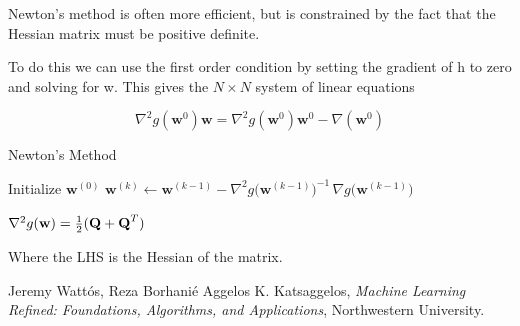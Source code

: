 \documentclass[11pt]{article}
\begin{document}
Newton's method is often more efficient, but is constrained by the fact that the Hessian matrix must be positive definite.

To do this we can use the first order condition by setting the gradient of h to zero and solving for w. This gives the $N \times N$ system
of linear equations

$$\nabla^2g(\textbf{w}^0)\textbf{w} = \nabla^2g(\textbf{w}^0)\textbf{w}^0 - \nabla(\textbf{w}^0)$$

\begin{algorithm}
\caption{Newton's Method}
\begin{algorithmic}
\State Initialize $\mathbf{w}^{(0)}$
  \State $\mathbf{w}^{(k)} \leftarrow \mathbf{w}^{(k-1)} 
  - \nabla^2 g\big(\mathbf{w}^{(k-1)}\big)^{-1}\,\nabla g\big(\mathbf{w}^{(k-1)}\big)$
\EndFor
\end{algorithmic}
\end{algorithm}

\begin{definition}
  $\nabla^2 g(\textbf{w}) = \frac{1}{2}(\textbf{Q} + \textbf{Q}^T)$
\end{definition}

Where the LHS is the Hessian of the matrix.
%


\begin{thebibliography}{77}

Jeremy Watt\'{o}s, Reza Borhani\'{e} Aggelos K. Katsaggelos,
\emph{Machine Learning Refined: Foundations, Algorithms, and Applications},
Northwestern University.

\end{thebibliography}
\end{document}

